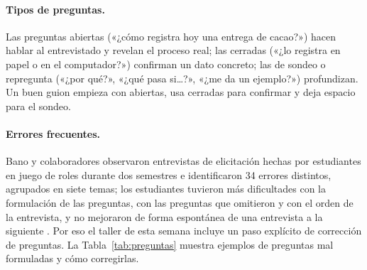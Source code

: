 \documentclass[11pt,a4paper,oneside]{report}
\begin{document}
\paragraph{Tipos de preguntas.} Las preguntas abiertas («¿cómo registra hoy una entrega de cacao?») hacen hablar al entrevistado y revelan el proceso real; las cerradas («¿lo registra en papel o en el computador?») confirman un dato concreto; las de sondeo o repregunta («¿por qué?», «¿qué pasa si\ldots?», «¿me da un ejemplo?») profundizan. Un buen guion empieza con abiertas, usa cerradas para confirmar y deja espacio para el sondeo.

\paragraph{Errores frecuentes.} Bano y colaboradores observaron entrevistas de elicitación hechas por estudiantes en juego de roles durante dos semestres e identificaron 34 errores distintos, agrupados en siete temas; los estudiantes tuvieron más dificultades con la formulación de las preguntas, con las preguntas que omitieron y con el orden de la entrevista, y no mejoraron de forma espontánea de una entrevista a la siguiente \citep{bano_2019}. Por eso el taller de esta semana incluye un paso explícito de corrección de preguntas. La Tabla~\ref{tab:preguntas} muestra ejemplos de preguntas mal formuladas y cómo corregirlas.
\end{document}
